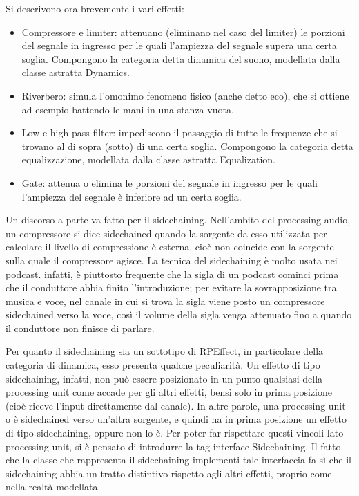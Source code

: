 \documentclass[a4paper,12pt]{report}
\begin{document}
Si descrivono ora brevemente i vari effetti:
\begin{itemize}
    \item Compressore e limiter: attenuano (eliminano nel caso del limiter) le porzioni del segnale in ingresso per le quali l’ampiezza del segnale supera una certa soglia. Compongono la categoria detta dinamica del suono, modellata dalla classe astratta Dynamics.
    \item Riverbero: simula l’omonimo fenomeno fisico (anche detto eco), che si ottiene ad esempio battendo le mani in una stanza vuota.
    \item Low e high pass filter: impediscono il passaggio di tutte le frequenze che si trovano al di sopra (sotto) di una certa soglia. Compongono la categoria detta equalizzazione, modellata dalla classe astratta Equalization.
    \item Gate: attenua o elimina le porzioni del segnale in ingresso per le quali l’ampiezza del segnale è inferiore ad un certa soglia.
\end{itemize}
Un discorso a parte va fatto per il sidechaining. Nell’ambito del processing audio, un compressore si dice sidechained quando la sorgente da esso utilizzata per calcolare il livello di compressione è esterna, cioè non coincide con la sorgente sulla quale il compressore agisce. La tecnica del sidechaining è molto usata nei podcast. infatti, è piuttosto frequente che la sigla di un podcast cominci prima che il conduttore abbia finito l’introduzione; per evitare la sovrapposizione tra musica e voce, nel canale in cui si trova la sigla viene posto un compressore sidechained verso la voce, così il volume della sigla venga attenuato fino a quando il conduttore non finisce di parlare. 

Per quanto il sidechaining sia un sottotipo di RPEffect, in particolare della categoria di dinamica, esso presenta qualche peculiarità. Un effetto di tipo sidechaining, infatti, non può essere posizionato in un punto qualsiasi della processing unit come accade per gli altri effetti, bensì solo in prima posizione (cioè riceve l’input direttamente dal canale). In altre parole, una processing unit o è sidechained verso un’altra sorgente, e quindi ha in prima posizione un effetto di tipo sidechaining, oppure non lo è. Per poter far rispettare questi vincoli lato processing unit, si è pensato di introdurre la tag interface Sidechaining. Il fatto che la classe che rappresenta il sidechaining implementi tale interfaccia fa sì che il sidechaining abbia un tratto distintivo rispetto agli altri effetti, proprio come nella realtà modellata.
\endsubsubsection
\endsubsection
\end{document}

